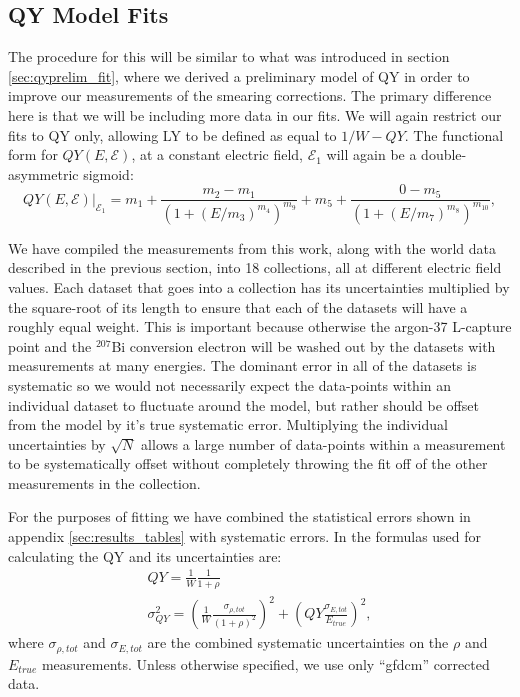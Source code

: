 \subsection{QY Model Fits}
The procedure for this will be similar to what was introduced in section \ref{sec:qyprelim_fit}, where we derived a preliminary model of QY in order to improve our measurements of the smearing corrections. The primary difference here is that we will be including more data in our fits. We will again restrict our fits to QY only, allowing LY to be defined as equal to $1/W-QY$. The functional form for $QY(E,\mathcal{E})$, at a constant electric field, $\mathcal{E}_1$ will again be a double-asymmetric sigmoid:
\begin{equation}
QY(E,\mathcal{E})|_{\mathcal{E}_1}=m_1+\frac{m_2-m_1}{(1+(E/m_3)^{m_4})^{m_9}}+m_5+\frac{0-m_5}{(1+(E/m_7)^{m_8})^{m_{10}}},
\end{equation}

We have compiled the measurements from this work, along with the world data described in the previous section, into 18 collections, all at different electric field values. Each dataset that goes into a collection has its uncertainties multiplied by the square-root of its length to ensure that each of the datasets will have a roughly equal weight. This is important because otherwise the argon-37 L-capture point and the $^{207}$Bi conversion electron will be washed out by the datasets with measurements at many energies. The dominant error in all of the datasets is systematic so we would not necessarily expect the data-points within an individual dataset to fluctuate around the model, but rather should be offset from the model by it's true systematic error. Multiplying the individual uncertainties by $\sqrt{N}$ allows a large number of data-points within a measurement to be systematically offset without completely throwing the fit off of the other measurements in the collection.

For the purposes of fitting we have combined the statistical errors shown in appendix \ref{sec:results_tables} with systematic errors. In the formulas used for calculating the QY and its uncertainties are:
\begin{equation}
\begin{split}
QY=\frac{1}{W}\frac{1}{1+\rho}\\
\sigma_{QY}^2=\left(\frac{1}{W}\frac{\sigma_{\rho,tot}}{(1+\rho)^2}\right)^2+\left(QY\frac{\sigma_{E,tot}}{E_{true}}\right)^2,
\end{split}
\end{equation}
where $\sigma_{\rho,tot}$ and $\sigma_{E,tot}$ are the combined systematic uncertainties on the $\rho$ and $E_{true}$ measurements. Unless otherwise specified, we use only ``gfdcm'' corrected data.

